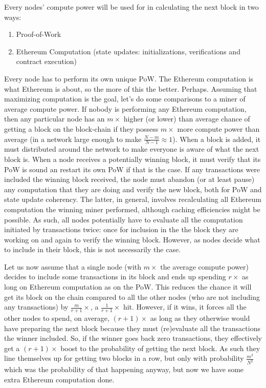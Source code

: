 \documentclass[10pt,a4paper]{article}
\begin{document}
Every nodes' compute power will be used for in calculating the next block in two ways:
\begin{enumerate} \itemsep=0pt
\item Proof-of-Work
\item Ethereum Computation (state updates: initializations, verifications and contract execution)
\end{enumerate}
Every node has to perform its own unique PoW. The Ethereum computation is what Ethereum is about, so the more of this the better. Perhaps. Assuming that maximizing computation is the goal, let's do some comparisons to a miner of average compute power. If nobody is performing any Ethereum computation, then any particular node has an $m\times$ higher (or lower) than average chance of getting a block on the block-chain if they possess $m\times$ more compute power than average (in a network large enough to make $\frac{N-m}{N-1}\approx 1$). When a block is added, it must distributed around the network to make everyone is aware of what the next block is. When a node receives a potentially winning block, it must verify that its PoW is sound an restart its own PoW if that is the case. If any transactions were included the winning block received, the node must abandon (or at least pause) any computation that they are doing and verify the new block, both for PoW and state update coherency. The latter, in general, involves recalculating all Ethereum computation the winning miner performed, although caching efficiencies might be possible. As such, all nodes potentially have to evaluate all the computation initiated by transactions twice: once for inclusion in the the block they are working on and again to verify the winning block. However, as nodes decide what to include in their block, this is not necessarily the case.

Let us now assume that a single node (with $m\times$ the average compute power) decides to include some transactions in its block and ends up spending $r\times$ as long on Ethereum computation as on the PoW. This reduces the chance it will get its block on the chain compared to all the other nodes (who are not including any transactions) by $\frac{m}{r+1}\times$, \ie a $\frac{1}{r+1}\times$ hit. However, if it wins, it forces all the other nodes to spend, on average, $(r+1)\times$ as long as they otherwise would have preparing the next block because they must (re)evaluate all the transactions the winner included. So, if the winner goes back zero transactions, they effectively get a $(r+1)\times$ boost to the probability of getting the next block. As such they line themselves up for getting two blocks in a row, but only with probability $\frac{m^2}{N^2}$ which was the probability of that happening anyway, but now we have some extra Ethereum computation done.
\end{document}
